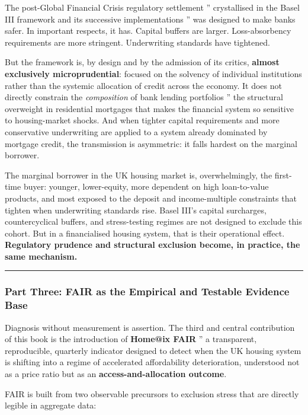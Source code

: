 \documentclass[
]{article}
\begin{document}
The post-Global Financial Crisis regulatory settlement '' crystallised
in the Basel III framework and its successive implementations '' was
designed to make banks safer. In important respects, it has. Capital
buffers are larger. Loss-absorbency requirements are more stringent.
Underwriting standards have tightened.

But the framework is, by design and by the admission of its critics,
\textbf{almost exclusively microprudential}: focused on the solvency of
individual institutions rather than the systemic allocation of credit
across the economy. It does not directly constrain the
\emph{composition} of bank lending portfolios '' the structural
overweight in residential mortgages that makes the financial system so
sensitive to housing-market shocks. And when tighter capital
requirements and more conservative underwriting are applied to a system
already dominated by mortgage credit, the transmission is asymmetric: it
falls hardest on the marginal borrower.

The marginal borrower in the UK housing market is, overwhelmingly, the
first-time buyer: younger, lower-equity, more dependent on high
loan-to-value products, and most exposed to the deposit and
income-multiple constraints that tighten when underwriting standards
rise. Basel III's capital surcharges, countercyclical buffers, and
stress-testing regimes are not designed to exclude this cohort. But in a
financialised housing system, that is their operational effect.
\textbf{Regulatory prudence and structural exclusion become, in
practice, the same mechanism.}

\begin{center}\rule{0.5\linewidth}{0.5pt}\end{center}

\subsubsection{Part Three: FAIR as the Empirical and Testable Evidence
Base}\label{part-three-fair-as-the-empirical-and-testable-evidence-base}

Diagnosis without measurement is assertion. The third and central
contribution of this book is the introduction of \textbf{Home@ix FAIR}
'' a transparent, reproducible, quarterly indicator designed to detect
when the UK housing system is shifting into a regime of accelerated
affordability deterioration, understood not as a price ratio but as an
\textbf{access-and-allocation outcome}.

FAIR is built from two observable precursors to exclusion stress that
are directly legible in aggregate data:
\end{document}
